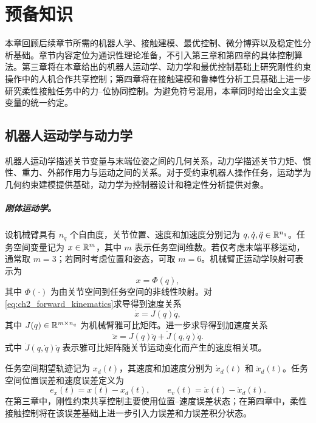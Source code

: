 \chapter{预备知识}
\label{chap:preliminaries}

本章回顾后续章节所需的机器人学、接触建模、最优控制、微分博弈以及稳定性分析基础。章节内容定位为通识性理论准备，不引入第三章和第四章的具体控制算法。第三章将在本章给出的机器人运动学、动力学和最优控制基础上研究刚性约束操作中的人机合作共享控制；第四章将在接触建模和鲁棒性分析工具基础上进一步研究柔性接触任务中的力--位协同控制。为避免符号混用，本章同时给出全文主要变量的统一约定。

\section{机器人运动学与动力学}
\label{sec:ch2_robotics}

机器人运动学描述关节变量与末端位姿之间的几何关系，动力学描述关节力矩、惯性、重力、外部作用力与运动之间的关系。对于受约束机器人操作任务，运动学为几何约束建模提供基础，动力学为控制器设计和稳定性分析提供对象。

\paragraph{刚体运动学。}
\label{subsec:ch2_kinematics}

设机械臂具有 $n_q$ 个自由度，关节位置、速度和加速度分别记为 $q,\dot q,\ddot q\in\mathbb{R}^{n_q}$。任务空间变量记为 $x\in\mathbb{R}^m$，其中 $m$ 表示任务空间维数。若仅考虑末端平移运动，通常取 $m=3$；若同时考虑位置和姿态，可取 $m=6$。机械臂正运动学映射可表示为
\begin{equation}
  x=\Phi(q),
  \label{eq:ch2_forward_kinematics}
\end{equation}
其中 $\Phi(\cdot)$ 为由关节空间到任务空间的非线性映射。对\eqref{eq:ch2_forward_kinematics}求导得到速度关系
\begin{equation}
  \dot x=J(q)\dot q,
  \label{eq:ch2_jacobian_velocity}
\end{equation}
其中 $J(q)\in\mathbb{R}^{m\times n_q}$ 为机械臂雅可比矩阵。进一步求导得到加速度关系
\begin{equation}
  \ddot x=J(q)\ddot q+\dot J(q,\dot q)\dot q .
  \label{eq:ch2_jacobian_acceleration}
\end{equation}
式中 $\dot J(q,\dot q)\dot q$ 表示雅可比矩阵随关节运动变化而产生的速度相关项。

\begin{definition}[任务空间与误差变量]
\label{def:ch2_task_error}
任务空间期望轨迹记为 $x_d(t)$，其速度和加速度分别为 $\dot x_d(t)$ 和 $\ddot x_d(t)$。任务空间位置误差和速度误差定义为
\begin{equation}
  e_x(t)=x(t)-x_d(t),\qquad e_v(t)=\dot x(t)-\dot x_d(t).
  \label{eq:ch2_basic_errors}
\end{equation}
在第三章中，刚性约束共享控制主要使用位置--速度误差状态；在第四章中，柔性接触控制将在该误差基础上进一步引入力误差和力误差积分状态。
\end{definition}

